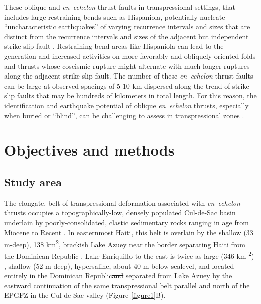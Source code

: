 \documentclass[linenumbers,draft]{agujournal}
\providecommand{\DIFaddtex}[1]{{\protect\color{blue}\uwave{#1}}} %
\providecommand{\DIFdeltex}[1]{{\protect\color{red}\sout{#1}}}                      %
\providecommand{\DIFaddbegin}{} %
\providecommand{\DIFaddend}{} %
\providecommand{\DIFdelbegin}{} %
\providecommand{\DIFdelend}{} %
\providecommand{\DIFadd}[1]{\texorpdfstring{\DIFaddtex{#1}}{#1}} %
\providecommand{\DIFdel}[1]{\texorpdfstring{\DIFdeltex{#1}}{}} %
\begin{document}
These oblique and \textit{en~echelon} thrust faults in transpressional settings, that includes large restraining bends such as Hispaniola, potentially nucleate ``uncharacteristic earthquakes'' of varying recurrence intervals and sizes that are distinct from the recurrence intervals and sizes of the adjacent but independent strike-slip \DIFdelbegin \DIFdel{fault }\DIFdelend \DIFaddbegin \DIFadd{faults }\DIFaddend \citep{Fielding2013}. Restraining bend areas like Hispaniola can lead to the generation and increased activities on more favorably and obliquely oriented folds and thrusts whose coseismic rupture might alternate with much longer ruptures along the adjacent strike-slip fault. The number of these \textit{en~echelon} thrust faults can be large at observed spacings of 5-10 km dispersed along the trend of strike-slip faults that may be hundreds of kilometers in total length. For this reason, the identification and earthquake potential of oblique \textit{en~echelon} thrusts, especially when buried or ``blind'', can be challenging to assess in transpressional zones \citep{frankel2011seismic}.

\section{Objectives and methods}
\subsection{Study area}
The elongate, belt of transpressional deformation associated with \textit{en~echelon} thrusts occupies a topographically-low, densely populated Cul-de-Sac basin underlain by poorly-consolidated, clastic sedimentary rocks ranging in age from Miocene to Recent \citep{massoni1955haiti,mann1995actively,terrier2014revision,saint2015seismotectonics}. In easternmost Haiti, this belt is overlain by the shallow (33 m-deep), 138 km\textsuperscript{2}, brackish Lake Azuey near the border separating Haiti from the Dominican Republic \citep{wright2015factors,piasecki2016bathymetric}. Lake Enriquillo to the east is twice as large (346 km \textsuperscript{2}) \DIFaddbegin \DIFadd{as Azuey}\DIFaddend , shallow (52 m-deep), hypersaline, about 40 m below sealevel, and located entirely in the Dominican Republic\DIFdelbegin \DIFdel{and }\DIFdelend \DIFaddbegin \DIFadd{. Lake Enriquillo is }\DIFaddend separated from Lake Azuey by the eastward continuation of the same transpressional belt parallel and north of the EPGFZ in the Cul-de-Sac valley \citep{mann1995actively} (Figure \ref{figure1}B). 
\end{document}
